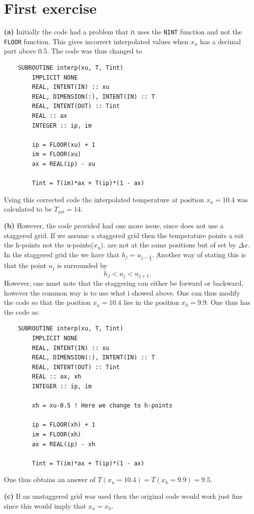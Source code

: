 \newpage
\section{First exercise}

\textbf{(a)} Initially the code had a problem that it uses the \texttt{NINT} function and not the \texttt{FLOOR} function. This gives incorrect interpolated values when $x_u$ has a decimal part above 0.5. The code was thus changed to 
\begin{verbatim}
    SUBROUTINE interp(xu, T, Tint)
        IMPLICIT NONE
        REAL, INTENT(IN) :: xu
        REAL, DIMENSION(:), INTENT(IN) :: T
        REAL, INTENT(OUT) :: Tint
        REAL :: ax
        INTEGER :: ip, im

        ip = FLOOR(xu) + 1
        im = FLOOR(xu)
        ax = REAL(ip) - xu

        Tint = T(im)*ax + T(ip)*(1 - ax)
\end{verbatim}
Using this corrected code the interpolated temperature at position $x_u=10.4$ was calculated to be $T_{int}=14$. 

\textbf{(b)} However, the code provided had one more issue, since does not use a staggered grid. If we assume a staggered grid then the temperature points a eat the h-points not the u-points($x_u$). are not at the same positions but of set by $\Delta x$. In the staggered grid the we have that $h_j=u_{j-\frac{1}{2}}$. Another way of stating this is that the point $u_j$ is surrounded by 
\begin{equation}
    h_{j}< u_j<u_{j+1}. 
\end{equation}
However, one must note that the staggering can either be forward or backward, however the common way is to use what i showed above. One can thus modify the code so that the position $x_u=10.4$ lies in the position $x_h=9.9$. One thus has the code as:
\begin{verbatim}
    SUBROUTINE interp(xu, T, Tint)
        IMPLICIT NONE
        REAL, INTENT(IN) :: xu
        REAL, DIMENSION(:), INTENT(IN) :: T
        REAL, INTENT(OUT) :: Tint
        REAL :: ax, xh
        INTEGER :: ip, im

        xh = xu-0.5 ! Here we change to h-points

        ip = FLOOR(xh) + 1
        im = FLOOR(xh)
        ax = REAL(ip) - xh

        Tint = T(im)*ax + T(ip)*(1 - ax)
\end{verbatim}

\begin{answer}
    One thus obtains an answer of $T(x_u=10.4)=T(x_h=9.9)=9.5$.
\end{answer}

\textbf{(c)} If an unstaggered grid was used then the original code would work just fine since this would imply that $x_u=x_h$. 